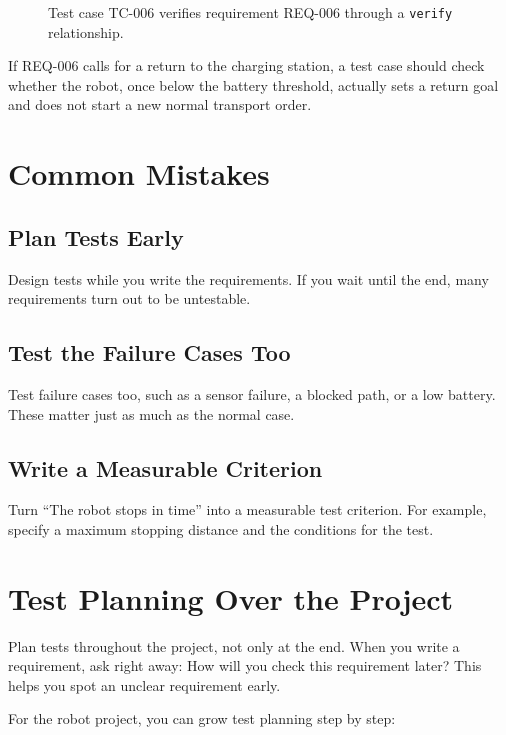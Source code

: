 \begin{figure}[H]
  \centering
  \caption{Test case TC-006 verifies requirement REQ-006 through a \texttt{verify} relationship.}
  \label{fig:kap19-verify-beziehung}
\end{figure}

\begin{praxisbox}
If REQ-006 calls for a return to the charging station, a test case should check whether the robot, once below the battery threshold, actually sets a return goal and does not start a new normal transport order.
\end{praxisbox}

\section{Common Mistakes}
\subsection{Plan Tests Early}
Design tests while you write the requirements. If you wait until the end, many requirements turn out to be untestable.

\subsection{Test the Failure Cases Too}
Test failure cases too, such as a sensor failure, a blocked path, or a low battery. These matter just as much as the normal case.

\subsection{Write a Measurable Criterion}
Turn \enquote{The robot stops in time} into a measurable test criterion. For example, specify a maximum stopping distance and the conditions for the test.

\section{Test Planning Over the Project}
Plan tests throughout the project, not only at the end. When you write a requirement, ask right away: How will you check this requirement later? This helps you spot an unclear requirement early.

For the robot project, you can grow test planning step by step:


